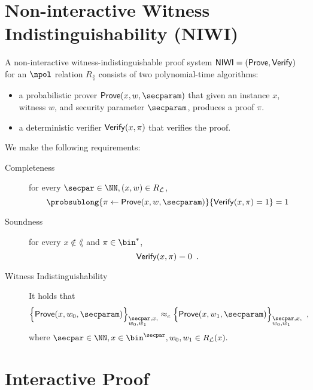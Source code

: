 


\section{Non-interactive Witness Indistinguishability (NIWI)}
	\label{sec:defn:NIWI}
	
	\begin{definition} 
	A non-interactive witness-indistinguishable proof system $\mathsf{NIWI}=(\mathsf{Prove},\mathsf{Verify})$ for an $\npol$ relation $R_\lang$ consists of two polynomial-time algorithms:
		\begin{itemize}
			\item a probabilistic prover $\prove(x,w,\secparam)$ that given an instance $x$, witness $w$, and security parameter $\secparam$, produces a proof $\pi$.
			\item a deterministic verifier $\mathsf{Verify}(x,\pi)$ that verifies the proof.
		\end{itemize}
		We make the following requirements:
		\begin{description}
			\item[Completeness] for every $\secpar \in \NN, (x,w) \in R_\lang$,
			\[
				\probsublong{\pi \leftarrow \prove(x,w,\secparam)}{\verify(x,\pi)=1} = 1
			\]
			\item[Soundness] for every $x \notin \lang$ and $\pi \in \bin^*$,
			\[
				\mathsf{Verify}(x,\pi)=0\enspace.
			\]
			\item[Witness Indistinguishability] It holds that
			\[
				\Big\lbrace \prove(x,w_0,\secparam) \Big\rbrace_{\begin{subarray}{l}\secpar,x,\\w_0,w_1 \end{subarray}} \approx_c 				\Big\lbrace \prove(x,w_1,\secparam) \Big\rbrace_{\begin{subarray}{l}\secpar,x,\\w_0,w_1 \end{subarray}}\enspace,
			\]
where $\secpar \in \NN, x \in \bin^\secpar, w_0,w_1 \in R_\lang(x).$
		\end{description}
	\end{definition}


\section{Interactive Proof}

